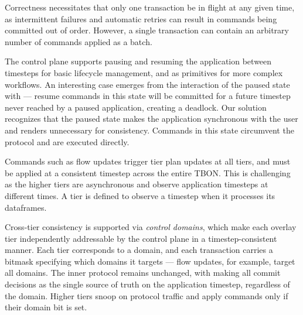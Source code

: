 Correctness necessitates that only one transaction be in flight at any given time, as intermittent
failures and automatic retries can result in commands being committed out of order.
However, a single transaction can contain an arbitrary number of commands applied as a batch.

The control plane supports pausing and resuming the application between timesteps for basic
lifecycle management, and as primitives for more complex workflows.
An interesting case emerges from the interaction of the paused state with \twopc{} --- resume
commands in this state will be committed for a future timestep never reached by a paused
application, creating a deadlock.
Our solution recognizes that the paused state makes the application synchronous with the user and
renders \twopc{} unnecessary for consistency.
Commands in this state circumvent the protocol and are executed directly.

Commands such as flow updates trigger tier plan updates at all tiers, and must be applied at a
consistent timestep across the entire TBON.
This is challenging as the higher tiers are asynchronous and observe application timesteps at
different times.
A tier is defined to observe a timestep when it processes its dataframes.


Cross-tier consistency is supported via \emph{control domains}, which make each overlay tier
independently addressable by the control plane in a timestep-consistent manner.
Each tier corresponds to a domain, and each transaction carries a bitmask specifying which domains
it targets --- flow updates, for example, target all domains.
The inner protocol remains unchanged, with \tiermpi{} making all commit
decisions as the single source of truth on the application timestep, regardless of the domain.
Higher tiers snoop on protocol traffic and apply commands only if their domain bit is set.

